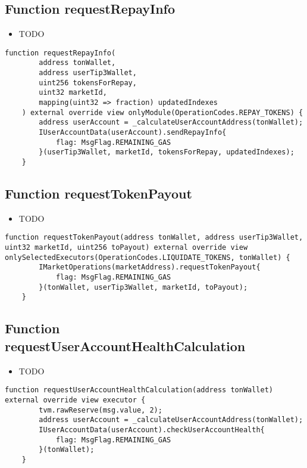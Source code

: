 \subsection{Function requestRepayInfo}

\noindent\begin{itemize}
\item TODO
\end{itemize}

\begin{lstlisting}[firstnumber=275]
    function requestRepayInfo(
        address tonWallet, 
        address userTip3Wallet, 
        uint256 tokensForRepay, 
        uint32 marketId,
        mapping(uint32 => fraction) updatedIndexes
    ) external override view onlyModule(OperationCodes.REPAY_TOKENS) {
        address userAccount = _calculateUserAccountAddress(tonWallet);
        IUserAccountData(userAccount).sendRepayInfo{
            flag: MsgFlag.REMAINING_GAS
        }(userTip3Wallet, marketId, tokensForRepay, updatedIndexes);
    }
\end{lstlisting}

\subsection{Function requestTokenPayout}

\noindent\begin{itemize}
\item TODO
\end{itemize}

\begin{lstlisting}[firstnumber=476]
    function requestTokenPayout(address tonWallet, address userTip3Wallet, uint32 marketId, uint256 toPayout) external override view onlySelectedExecutors(OperationCodes.LIQUIDATE_TOKENS, tonWallet) {
        IMarketOperations(marketAddress).requestTokenPayout{
            flag: MsgFlag.REMAINING_GAS
        }(tonWallet, userTip3Wallet, marketId, toPayout);
    }
\end{lstlisting}

\subsection{Function requestUserAccountHealthCalculation}

\noindent\begin{itemize}
\item TODO
\end{itemize}

\begin{lstlisting}[firstnumber=438]
    function requestUserAccountHealthCalculation(address tonWallet) external override view executor {
        tvm.rawReserve(msg.value, 2);
        address userAccount = _calculateUserAccountAddress(tonWallet);
        IUserAccountData(userAccount).checkUserAccountHealth{
            flag: MsgFlag.REMAINING_GAS
        }(tonWallet);
    }
\end{lstlisting}

